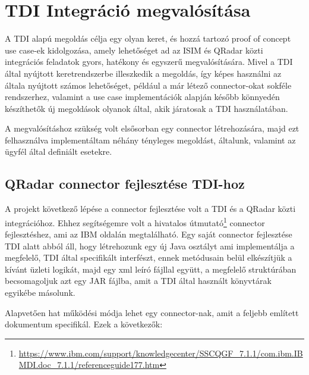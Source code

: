 \section{TDI Integráció megvalósítása}
A TDI alapú megoldás célja egy olyan keret, és hozzá tartozó proof of concept use case-ek kidolgozása, amely lehetőséget ad az ISIM és QRadar közti integrációs feladatok gyors, hatékony és egyszerű megvalósítására. Mivel a TDI által nyújtott keretrendszerbe illeszkedik a megoldás, így képes használni az általa nyújtott számos lehetőséget, például a már létező connector-okat sokféle rendszerhez, valamint a use case implementációk alapján később könnyedén készíthetők új megoldások olyanok által, akik járatosak a TDI használatában. 

A megvalósításhoz szükség volt elsősorban egy connector létrehozására, majd ezt felhasználva implementáltam néhány tényleges megoldást, általunk, valamint az ügyfél által definiált esetekre.
 
\subsection{QRadar connector fejlesztése TDI-hoz}
A projekt következő lépése a connector fejlesztése volt a TDI és a QRadar közti integrációhoz. Ehhez segítségemre volt a hivatalos útmutató\footnote{\url{https://www.ibm.com/support/knowledgecenter/SSCQGF_7.1.1/com.ibm.IBMDI.doc_7.1.1/referenceguide177.htm}} connector fejlesztéshez, ami az IBM oldalán megtalálható. Egy saját connector fejlesztése TDI alatt abból áll, hogy létrehozunk egy új Java osztályt ami implementálja a megfelelő, TDI által specifikált interfészt, ennek metódusain belül elkészítjük a kívánt üzleti logikát, majd egy xml leíró fájllal együtt, a megfelelő struktúrában becsomagoljuk azt egy JAR fájlba, amit a TDI által használt könyvtárak egyikébe másolunk. 

Alapvetően hat működési módja lehet egy connector-nak, amit a feljebb említett dokumentum specifikál. Ezek a következők:

